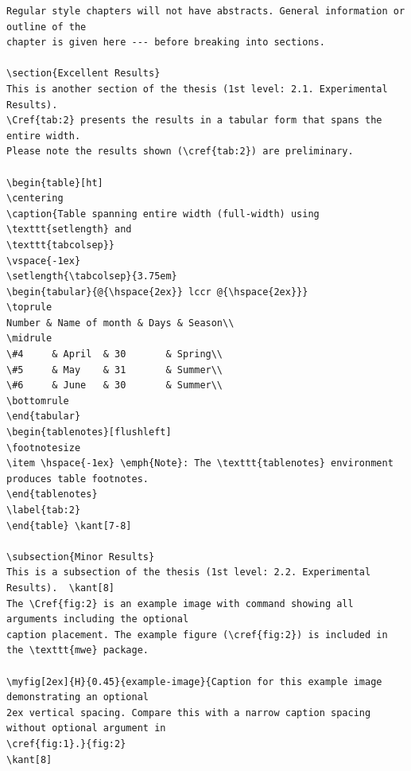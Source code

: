 \documentclass{article}
\begin{document}
\begin{verbatim}
Regular style chapters will not have abstracts. General information or outline of the
chapter is given here --- before breaking into sections.

\section{Excellent Results}
This is another section of the thesis (1st level: 2.1. Experimental Results).
\Cref{tab:2} presents the results in a tabular form that spans the entire width.
Please note the results shown (\cref{tab:2}) are preliminary.

\begin{table}[ht]
\centering
\caption{Table spanning entire width (full-width) using \texttt{setlength} and
\texttt{tabcolsep}}
\vspace{-1ex}
\setlength{\tabcolsep}{3.75em}
\begin{tabular}{@{\hspace{2ex}} lccr @{\hspace{2ex}}}
\toprule
Number & Name of month & Days & Season\\
\midrule
\#4 	& April  & 30		& Spring\\
\#5 	& May    & 31		& Summer\\
\#6 	& June   & 30		& Summer\\
\bottomrule
\end{tabular}
\begin{tablenotes}[flushleft]
\footnotesize
\item \hspace{-1ex} \emph{Note}: The \texttt{tablenotes} environment produces table footnotes. 
\end{tablenotes}
\label{tab:2}
\end{table}	\kant[7-8]

\subsection{Minor Results}
This is a subsection of the thesis (1st level: 2.2. Experimental Results). 	\kant[8]
The \Cref{fig:2} is an example image with command showing all arguments including the optional 
caption placement. The example figure (\cref{fig:2}) is included in the \texttt{mwe} package.

\myfig[2ex]{H}{0.45}{example-image}{Caption for this example image demonstrating an optional 
2ex vertical spacing. Compare this with a narrow caption spacing without optional argument in 
\cref{fig:1}.}{fig:2}
\kant[8]


\end{verbatim}
\end{document}
